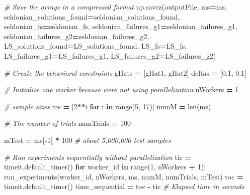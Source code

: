 \documentclass[12pt, twoside]{amherstthesis}
\newenvironment{Shaded}{\begin{snugshade}}{\end{snugshade}}
\newcommand{\BuiltInTok}[1]{#1}
\newcommand{\CommentTok}[1]{\textcolor[rgb]{0.56,0.35,0.01}{\textit{#1}}}
\newcommand{\ControlFlowTok}[1]{\textcolor[rgb]{0.13,0.29,0.53}{\textbf{#1}}}
\newcommand{\DecValTok}[1]{\textcolor[rgb]{0.00,0.00,0.81}{#1}}
\newcommand{\FloatTok}[1]{\textcolor[rgb]{0.00,0.00,0.81}{#1}}
\newcommand{\KeywordTok}[1]{\textcolor[rgb]{0.13,0.29,0.53}{\textbf{#1}}}
\newcommand{\NormalTok}[1]{#1}
\newcommand{\OperatorTok}[1]{\textcolor[rgb]{0.81,0.36,0.00}{\textbf{#1}}}
\begin{document}
\begin{Shaded}
\begin{Highlighting}[]
        
        
    \CommentTok{\# Save the arrays in a compressed format}
\NormalTok{    np.savez(outputFile, }
\NormalTok{             ms}\OperatorTok{=}\NormalTok{ms, }
\NormalTok{             seldonian\_solutions\_found}\OperatorTok{=}\NormalTok{seldonian\_solutions\_found,}
\NormalTok{             seldonian\_fs}\OperatorTok{=}\NormalTok{seldonian\_fs, }
\NormalTok{             seldonian\_failures\_g1}\OperatorTok{=}\NormalTok{seldonian\_failures\_g1, }
\NormalTok{             seldonian\_failures\_g2}\OperatorTok{=}\NormalTok{seldonian\_failures\_g2,}
\NormalTok{             LS\_solutions\_found}\OperatorTok{=}\NormalTok{LS\_solutions\_found,}
\NormalTok{             LS\_fs}\OperatorTok{=}\NormalTok{LS\_fs,}
\NormalTok{             LS\_failures\_g1}\OperatorTok{=}\NormalTok{LS\_failures\_g1,}
\NormalTok{             LS\_failures\_g2}\OperatorTok{=}\NormalTok{LS\_failures\_g2)}
\end{Highlighting}
\end{Shaded}
\begin{Shaded}
\begin{Highlighting}[]
\CommentTok{\# Create the behavioral constraints}
\NormalTok{gHats  }\OperatorTok{=}\NormalTok{ [gHat1, gHat2]}
\NormalTok{deltas }\OperatorTok{=}\NormalTok{ [}\FloatTok{0.1}\NormalTok{, }\FloatTok{0.1}\NormalTok{]}

\CommentTok{\# Initialize one worker because we\textquotesingle{}re not using parallelization}
\NormalTok{nWorkers }\OperatorTok{=} \DecValTok{1}  

\CommentTok{\# sample sizes}
\NormalTok{ms   }\OperatorTok{=}\NormalTok{ [}\DecValTok{2}\OperatorTok{**}\NormalTok{i }\ControlFlowTok{for}\NormalTok{ i }\KeywordTok{in} \BuiltInTok{range}\NormalTok{(}\DecValTok{5}\NormalTok{, }\DecValTok{17}\NormalTok{)]  }
\NormalTok{numM }\OperatorTok{=} \BuiltInTok{len}\NormalTok{(ms)}
    
\CommentTok{\# The number of trials}
\NormalTok{numTrials }\OperatorTok{=} \DecValTok{100}  

\NormalTok{mTest }\OperatorTok{=}\NormalTok{ ms[}\OperatorTok{{-}}\DecValTok{1}\NormalTok{] }\OperatorTok{*} \DecValTok{100} \CommentTok{\# about 5,000,000 test samples}

\CommentTok{\# Run experiments sequentially without parallelization}
\NormalTok{tic }\OperatorTok{=}\NormalTok{ timeit.default\_timer()}
\ControlFlowTok{for}\NormalTok{ worker\_id }\KeywordTok{in} \BuiltInTok{range}\NormalTok{(}\DecValTok{1}\NormalTok{, nWorkers }\OperatorTok{+} \DecValTok{1}\NormalTok{):}
\NormalTok{    run\_experiments(worker\_id, nWorkers, ms, numM, numTrials, mTest)}
\NormalTok{toc }\OperatorTok{=}\NormalTok{ timeit.default\_timer()}
\NormalTok{time\_sequential }\OperatorTok{=}\NormalTok{ toc }\OperatorTok{{-}}\NormalTok{ tic }\CommentTok{\# Elapsed time in seconds}
\end{Highlighting}
\end{Shaded}
\end{document}
